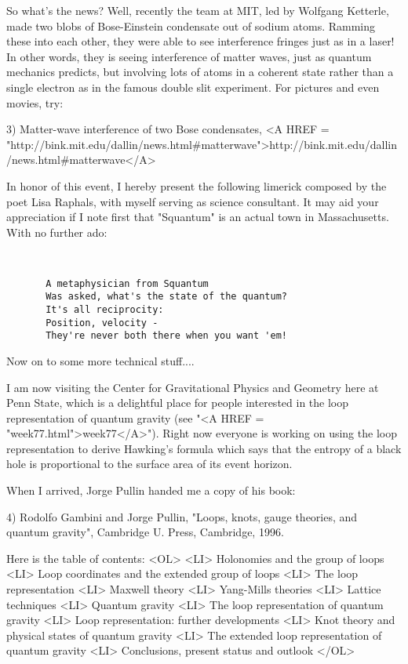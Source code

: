 So what's the news?  Well, recently the team at MIT, led by Wolfgang
Ketterle, made two blobs of Bose-Einstein condensate out of sodium
atoms.  Ramming these into each other, they were able to see
interference fringes just as in a laser!  In other words, they is
seeing interference of matter waves, just as quantum mechanics
predicts, but involving lots of atoms in a coherent state rather than
a single electron as in the famous double slit experiment.  For
pictures and even movies, try:

3) Matter-wave interference of two Bose condensates,
<A HREF = "http://bink.mit.edu/dallin/news.html#matterwave">http://bink.mit.edu/dallin/news.html#matterwave</A>

In honor of this event, I hereby present the following limerick
composed by the poet Lisa Raphals, with myself serving as science
consultant.  It may aid your appreciation if I note first that
"Squantum" is an actual town in Massachusetts.  With no further ado:



\begin{verbatim}


       A metaphysician from Squantum
       Was asked, what's the state of the quantum?
       It's all reciprocity:
       Position, velocity -
       They're never both there when you want 'em!

\end{verbatim}
    
Now on to some more technical stuff....

I am now visiting the Center for Gravitational Physics and Geometry
here at Penn State, which is a delightful place for people interested
in the loop representation of quantum gravity (see "<A HREF = "week77.html">week77</A>").  Right
now everyone is working on using the loop representation to derive
Hawking's formula which says that the entropy of a black hole is
proportional to the surface area of its event horizon.  

When I arrived, Jorge Pullin handed me a copy of his book:

4) Rodolfo Gambini and Jorge Pullin, "Loops, knots, gauge theories,
and quantum gravity", Cambridge U. Press, Cambridge, 1996.

Here is the table of contents:
<OL>
<LI> Holonomies and the group of loops
<LI> Loop coordinates and the extended group of loops
<LI> The loop representation
<LI> Maxwell theory
<LI> Yang-Mills theories
<LI> Lattice techniques
<LI> Quantum gravity
<LI> The loop representation of quantum gravity
<LI> Loop representation: further developments
<LI> Knot theory and physical states of quantum gravity
<LI> The extended loop representation of quantum gravity
<LI> Conclusions, present status and outlook
</OL>


